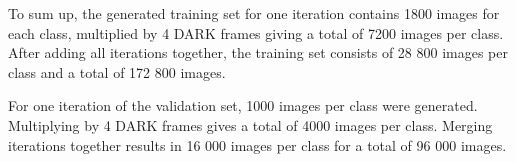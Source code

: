 To sum up, the generated training set for one iteration contains 1800 images for each class, multiplied by 4 DARK frames giving a total of 7200 images per class. After adding all iterations together, the training set consists of 28 800 images per class and a total of 172 800 images. 

For one iteration of the validation set, 1000 images per class were generated. Multiplying by 4 DARK frames gives a total of 4000 images per class. Merging iterations together results in 16 000 images per class for a total of 96 000 images.
